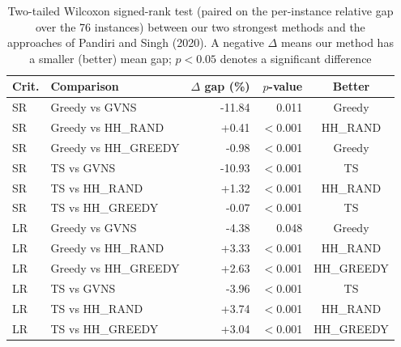 \begin{table}[t]
\centering
\caption{Two-tailed Wilcoxon signed-rank test (paired on the per-instance relative gap over the 76 instances) between our two strongest methods and the approaches of Pandiri and Singh (2020). A negative $\Delta$ means our method has a smaller (better) mean gap; $p<0.05$ denotes a significant difference}
\label{tab:wilcoxon}
\begin{tabular}{llrrc}
\hline
Crit. & Comparison & $\Delta$ gap (\%) & $p$-value & Better \\
\hline
SR & Greedy vs GVNS & -11.84 & 0.011 & Greedy \\
SR & Greedy vs HH\_RAND & +0.41 & $<$0.001 & HH\_RAND \\
SR & Greedy vs HH\_GREEDY & -0.98 & $<$0.001 & Greedy \\
SR & TS vs GVNS & -10.93 & $<$0.001 & TS \\
SR & TS vs HH\_RAND & +1.32 & $<$0.001 & HH\_RAND \\
SR & TS vs HH\_GREEDY & -0.07 & $<$0.001 & TS \\
\hline
LR & Greedy vs GVNS & -4.38 & 0.048 & Greedy \\
LR & Greedy vs HH\_RAND & +3.33 & $<$0.001 & HH\_RAND \\
LR & Greedy vs HH\_GREEDY & +2.63 & $<$0.001 & HH\_GREEDY \\
LR & TS vs GVNS & -3.96 & $<$0.001 & TS \\
LR & TS vs HH\_RAND & +3.74 & $<$0.001 & HH\_RAND \\
LR & TS vs HH\_GREEDY & +3.04 & $<$0.001 & HH\_GREEDY \\
\hline
\end{tabular}
\end{table}
